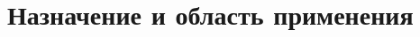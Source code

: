 \section{Назначение и область применения}

\headingtextsep

\underline{\hspace{\textwidth}}

\underline{\hspace{\textwidth}}

\underline{\hspace{\textwidth}}

\underline{\hspace{\textwidth}}
